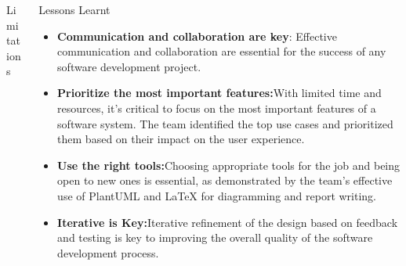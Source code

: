 \documentclass[final]{beamer}
\newlength{\onecolwid}
\newlength{\twocolwid}
\begin{document}
\begin{frame}[t]
\begin{columns}[t]
\begin{column}{\twocolwid}
\begin{columns}[t,totalwidth=\twocolwid]
\begin{column}{\onecolwid}
\begin{block}{Limitations}
\end{block}


\end{column} %

\begin{column}{\onecolwid}\vspace{-.6in} %

\begin{block}{Lessons Learnt}
    
\begin{alertblock}{ }
\begin{itemize}
    \item \textbf{Communication and collaboration are key}: Effective communication and collaboration are essential for the success of any software development project. 
    \item \textbf{Prioritize the most important features:}With limited time and resources, it's critical to focus on the most important features of a software system. The team identified the top use cases and prioritized them based on their impact on the user experience.
    \item \textbf{Use the right tools:}Choosing appropriate tools for the job and being open to new ones is essential, as demonstrated by the team's effective use of PlantUML and LaTeX for diagramming and report writing.
    \item \textbf{Iterative is Key:}Iterative refinement of the design based on feedback and testing is key to improving the overall quality of the software development process.
\end{itemize}
\end{alertblock}
\end{block}


\end{column}
\end{columns}
\end{column}
\end{columns}
\end{frame}
\end{document}
